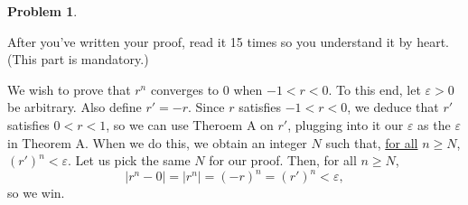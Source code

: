 \documentclass[11pt,oneside]{amsart}
\theoremstyle{definition}
\newtheorem{problem}{Problem}
\theoremstyle{plain}
\newcommand{\eps}{\varepsilon}
\begin{document}
\begin{problem}
\begin{enumerate}[(a)]
            After you've written your proof, read it 15 times so you understand it by heart. (This part is mandatory.)
            \begin{solution}
                We wish to prove that $r^n$ converges to 0 when $-1<r<0$. To this end, let $\eps>0$ be arbitrary. Also define $r'=-r$. Since $r$ satisfies $-1<r<0$, we deduce that $r'$ satisfies \underline{$0<r<1$}, so we can use Theroem A on $r'$, plugging into it our $\eps$ as the $\eps$ in Theorem A. When we do this, we obtain an integer $N$ such that, \underline{for all} $n\geq N$, \underline{$(r')^n<\eps$}. Let us pick the same $N$ for our proof. Then, for all $n\geq N$,
                \[|r^n-0|=|r^n|=(-r)^n=(r')^n<\eps,\]
                so we win.
            \end{solution}
        \end{enumerate}
    \end{problem}
\end{document}
